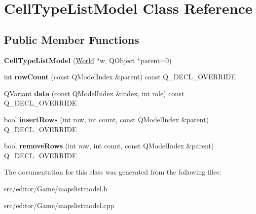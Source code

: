 \hypertarget{class_cell_type_list_model}{\section{\-Cell\-Type\-List\-Model \-Class \-Reference}
\label{class_cell_type_list_model}
}
\subsection*{\-Public \-Member \-Functions}
\begin{DoxyCompactItemize}
\item 
\hypertarget{class_cell_type_list_model_a3e5614c6b52577d4d673ac28e5b19c59}{{\bfseries \-Cell\-Type\-List\-Model} (\hyperlink{class_world}{\-World} $\ast$w, \-Q\-Object $\ast$parent=0)}\label{class_cell_type_list_model_a3e5614c6b52577d4d673ac28e5b19c59}

\item 
\hypertarget{class_cell_type_list_model_a4d19e3ec13380dc4ecfea9ceafdc78b9}{int {\bfseries row\-Count} (const \-Q\-Model\-Index \&parent) const \-Q\-\_\-\-D\-E\-C\-L\-\_\-\-O\-V\-E\-R\-R\-I\-D\-E}\label{class_cell_type_list_model_a4d19e3ec13380dc4ecfea9ceafdc78b9}

\item 
\hypertarget{class_cell_type_list_model_a949e9fd005335e0024fb66f63113078d}{\-Q\-Variant {\bfseries data} (const \-Q\-Model\-Index \&index, int role) const \-Q\-\_\-\-D\-E\-C\-L\-\_\-\-O\-V\-E\-R\-R\-I\-D\-E}\label{class_cell_type_list_model_a949e9fd005335e0024fb66f63113078d}

\item 
\hypertarget{class_cell_type_list_model_aeff00ffac0dd7bce76a505d2eabfed49}{bool {\bfseries insert\-Rows} (int row, int count, const \-Q\-Model\-Index \&parent) \-Q\-\_\-\-D\-E\-C\-L\-\_\-\-O\-V\-E\-R\-R\-I\-D\-E}\label{class_cell_type_list_model_aeff00ffac0dd7bce76a505d2eabfed49}

\item 
\hypertarget{class_cell_type_list_model_abe5727a0615f06531cfa271a607785a4}{bool {\bfseries remove\-Rows} (int row, int count, const \-Q\-Model\-Index \&parent) \-Q\-\_\-\-D\-E\-C\-L\-\_\-\-O\-V\-E\-R\-R\-I\-D\-E}\label{class_cell_type_list_model_abe5727a0615f06531cfa271a607785a4}

\end{DoxyCompactItemize}


\-The documentation for this class was generated from the following files\-:\begin{DoxyCompactItemize}
\item 
src/editor/\-Game/mapslistmodel.\-h\item 
src/editor/\-Game/mapslistmodel.\-cpp\end{DoxyCompactItemize}
